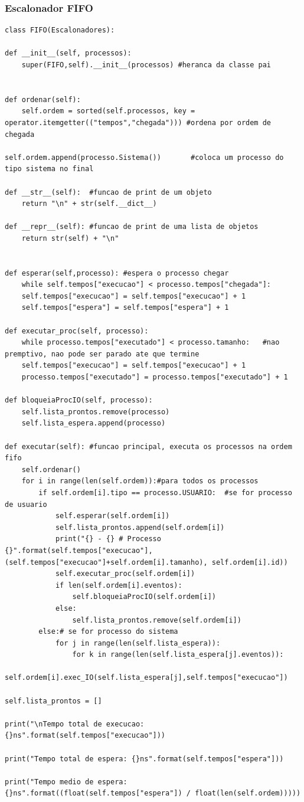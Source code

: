 \documentclass[times, 10pt,twocolumn]{article}
\begin{document}
\subsubsection{Escalonador FIFO} 
\begin{lstlisting} 
class FIFO(Escalonadores):

def __init__(self, processos):
	super(FIFO,self).__init__(processos) #heranca da classe pai


def ordenar(self):
	self.ordem = sorted(self.processos, key = operator.itemgetter(("tempos","chegada"))) #ordena por ordem de chegada

self.ordem.append(processo.Sistema())       #coloca um processo do tipo sistema no final

def __str__(self):  #funcao de print de um objeto
	return "\n" + str(self.__dict__) 

def __repr__(self): #funcao de print de uma lista de objetos
	return str(self) + "\n" 


def esperar(self,processo): #espera o processo chegar
	while self.tempos["execucao"] < processo.tempos["chegada"]:
	self.tempos["execucao"] = self.tempos["execucao"] + 1 
	self.tempos["espera"] = self.tempos["espera"] + 1 

def executar_proc(self, processo): 
	while processo.tempos["executado"] < processo.tamanho:   #nao premptivo, nao pode ser parado ate que termine
	self.tempos["execucao"] = self.tempos["execucao"] + 1
	processo.tempos["executado"] = processo.tempos["executado"] + 1 

def bloqueiaProcIO(self, processo):
	self.lista_prontos.remove(processo)
	self.lista_espera.append(processo)

def executar(self): #funcao principal, executa os processos na ordem fifo
	self.ordenar()
	for i in range(len(self.ordem)):#para todos os processos
		if self.ordem[i].tipo == processo.USUARIO:  #se for processo de usuario
			self.esperar(self.ordem[i])
			self.lista_prontos.append(self.ordem[i])
			print("{} - {} # Processo {}".format(self.tempos["execucao"], (self.tempos["execucao"]+self.ordem[i].tamanho), self.ordem[i].id))
			self.executar_proc(self.ordem[i])
			if len(self.ordem[i].eventos):
				self.bloqueiaProcIO(self.ordem[i])
			else:
				self.lista_prontos.remove(self.ordem[i])
		else:# se for processo do sistema
			for j in range(len(self.lista_espera)):
				for k in range(len(self.lista_espera[j].eventos)):	
					self.ordem[i].exec_IO(self.lista_espera[j],self.tempos["execucao"]) 
					
self.lista_prontos = []

print("\nTempo total de execucao: {}ns".format(self.tempos["execucao"]))

print("Tempo total de espera: {}ns".format(self.tempos["espera"]))

print("Tempo medio de espera: {}ns".format((float(self.tempos["espera"]) / float(len(self.ordem)))))

\end{lstlisting}  
  
\end{document}
